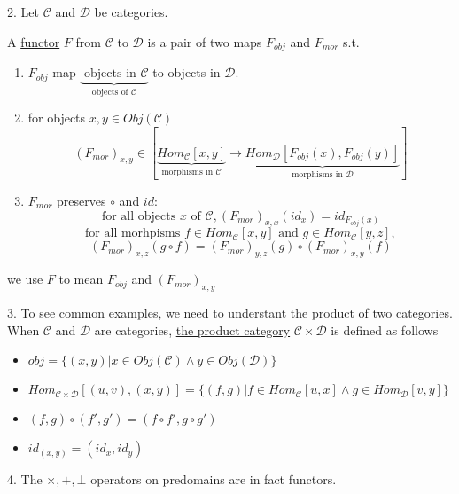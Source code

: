 \documentclass{report}[12pt]
\begin{document}
2. Let $\mathcal{C}$ and $\mathcal{D}$ be categories.
\begin{definition}
  A \underline{functor} $F$ from $\mathcal{C}$ to $\mathcal{D}$ is a pair of two maps $F_{obj}$ and $F_{mor}$ s.t.
  \begin{enumerate}
    \item $F_{obj}$ map $\underbrace{\text{ objects in }\mathcal{C}}_{\text{objects of }\mathcal{C}}$ to objects in $\mathcal{D}$.
    \item for objects $x, y\in Obj(\mathcal{C})$
    \[(F_{mor})_{x, y} \in [\underbrace{Hom_{\mathcal{C}} [x, y]}_{\text{morphisms in }\mathcal{C}} \rightarrow \underbrace{Hom_{\mathcal{D}}[F_{obj}(x), F_{obj}(y)]}_{\text{morphisms in }\mathcal{D}}]\]
    \item $F_{mor}$ preserves $\circ$ and $id$:
    \[\text{for all objects }x \text{ of }\mathcal{C}, (F_{mor})_{x,x}(id_x) = id_{F_{obj}(x)}\]
    \[\text{for all morhpisms } f\in Hom_{\mathcal{C}}[x, y]\text{ and }g \in Hom_{\mathcal{C}}[y, z],\]
    \[(F_{mor})_{x, z}(g \circ f) = (F_{mor})_{y, z}(g) \circ (F_{mor})_{x, y}(f)\]
  \end{enumerate}
  we use $F$ to mean $F_{obj}$ and $(F_{mor})_{x, y}$
\end{definition}
3. To see common examples, we need to understant the product of two categories. When $\mathcal{C}$ and $\mathcal{D}$ are categories, \underline{the product category} $\mathcal{C} \times \mathcal{D}$ is defined as follows
\begin{itemize}
  \item $obj = \{(x, y)|x\in Obj(\mathcal{C}) \wedge y \in Obj(\mathcal{D})\}$
  \item $Hom_{\mathcal{C}\times \mathcal{D}} [(u, v), (x, y)] = \{(f, g)|f \in Hom_{\mathcal{C}}[u, x] \wedge g \in Hom_{\mathcal{D}} [v, y]\}$
  \item $(f, g)\circ (f', g') = (f \circ f', g \circ g')$
  \item $id_{(x, y)} = (id_x, id_y)$
\end{itemize}
4. The $\times, +, \bot$ operators on predomains are in fact functors.
\end{document}
